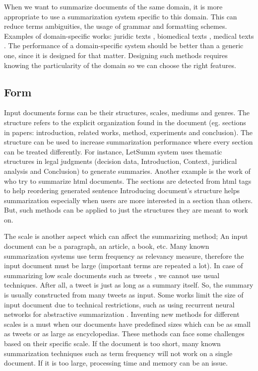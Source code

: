 When we want to summarize documents of the same domain, it is more appropriate to use a summarization system specific to this domain. 
This can reduce terms ambiguities, the usage of grammar and formatting schemes. 
Examples of domain-specific works: juridic texts \citep{04-farzindar-lapalme}, biomedical texts \citep{07-reeve-al}, medical texts \citep{09-sarkar,19-liang-al}.
The performance of a domain-specific system should be better than a generic one, since it is designed for that matter.
Designing such methods requires knowing the particularity of the domain so we can choose the right features.

\subsection{Form}

Input documents forms can be their structures, scales, mediums and genres. 
The structure refers to the explicit organization found in the document (eg. sections in papers: introduction, related works, method, experiments and conclusion).
The structure can be used to increase summarization performance where every section can be treated differently.
For instance, LetSumm system \citep{04-farzindar-lapalme} uses thematic structures in legal judgments (decision data, Introduction, Context, juridical analysis and Conclusion) to generate summaries. 
Another example is the work of \citet{07-pembe-gungor} who try to summarize \ac{html} documents. 
The sections are detected from \ac{html} tags to help reordering generated sentence
Introducing document's structure helps summarization especially when users are more interested in a section than others. 
But, such methods can be applied to just the structures they are meant to work on.

The scale is another aspect which can affect the summarizing method; An input document can be a paragraph, an article, a book, etc. 
Many known summarization systems use term frequency as relevancy measure, therefore the input document must be large (important terms are repeated a lot).
In case of summarizing low scale documents such as tweets \citet{10-sharifi-al,12-duan-al}, we cannot use usual techniques.
After all, a tweet is just as long as a summary itself. 
So, the summary is usually constructed from many tweets as input.
Some works limit the size of input document due to technical restrictions, such as using recurrent neural networks for abstractive summarization \citep{15-rush-al}. 
Inventing new methods for different scales is a must when our documents have predefined sizes which can be as small as tweets or as large as encyclopedias.  
These methods can face some challenges based on their specific scale.
If the document is too short, many known summarization techniques such as term frequency will not work on a single document.
If it is too large, processing time and memory can be an issue.

